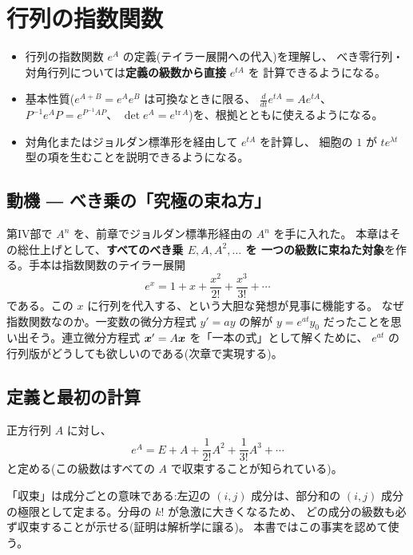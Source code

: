 \chapter{行列の指数関数}\label{chap:exp}

\begin{goal}
\begin{itemize}
\item 行列の指数関数 $e^{A}$ の定義(テイラー展開への代入)を理解し、
べき零行列・対角行列については\textbf{定義の級数から直接} $e^{tA}$ を
計算できるようになる。
\item 基本性質($e^{A+B} = e^{A}e^{B}$ は可換なときに限る、
$\frac{d}{dt}e^{tA} = Ae^{tA}$、$P^{-1}e^{A}P = e^{P^{-1}AP}$、
$\det e^{A} = e^{\mathrm{tr}\,A}$)を、根拠とともに使えるようになる。
\item 対角化またはジョルダン標準形を経由して $e^{tA}$ を計算し、
細胞の $1$ が $te^{\lambda t}$ 型の項を生むことを説明できるようになる。
\end{itemize}
\end{goal}

\section{動機 ― べき乗の「究極の束ね方」}

第IV部で $A^n$ を、前章でジョルダン標準形経由の $A^n$ を手に入れた。
本章はその総仕上げとして、\textbf{すべてのべき乗 $E, A, A^2, \dots$ を
一つの級数に束ねた対象}を作る。手本は指数関数のテイラー展開
\[
e^x = 1 + x + \frac{x^2}{2!} + \frac{x^3}{3!} + \cdots
\]
である。この $x$ に行列を代入する、という大胆な発想が見事に機能する。
なぜ指数関数なのか。一変数の微分方程式 $y' = ay$ の解が
$y = e^{at}y_0$ だったことを思い出そう。連立微分方程式
$\bm{x}' = A\bm{x}$ を「一本の式」として解くために、
$e^{at}$ の行列版がどうしても欲しいのである(次章で実現する)。

\section{定義と最初の計算}

\begin{teigi}[行列の指数関数]
正方行列 $A$ に対し、
\[
e^{A} = E + A + \frac{1}{2!}A^2 + \frac{1}{3!}A^3 + \cdots
\]
と定める(この級数はすべての $A$ で収束することが知られている)。
\end{teigi}

\begin{chui}
「収束」は成分ごとの意味である:左辺の $(i, j)$ 成分は、部分和の
$(i, j)$ 成分の極限として定まる。分母の $k!$ が急激に大きくなるため、
どの成分の級数も必ず収束することが示せる(証明は解析学に譲る)。
本書ではこの事実を認めて使う。
\end{chui}

